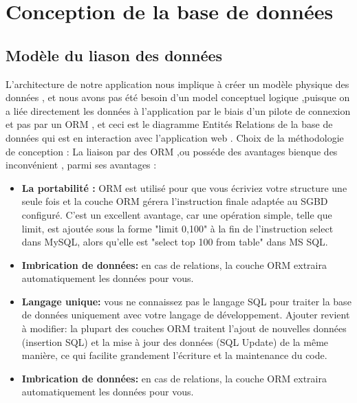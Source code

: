 \section{Conception de la base de donn\'{e}es}

\subsection{Mod\`{e}le du liason des donn\'{e}es }
L'architecture de notre application nous implique \`{a} cr\'{e}er un mod\`{e}le physique
des donn\'{e}es , et nous avons pas \'{e}t\'{e} besoin d'un model conceptuel logique
,puisque on a li\'{e}e directement les donn\'{e}es \`{a} l'application par le biais d'un
pilote de connexion et pas par un ORM , et ceci est le diagramme
Entit\'{e}s \textendash{}Relations de la base de donn\'{e}es qui est en interaction avec
l'application web .
Choix de la m\'{e}thodologie de conception :
La liaison par des ORM ,ou poss\'{e}de des avantages bienque des inconv\'{e}nient ,
parmi ses avantages :

\bigskip
\begin{itemize}
\item{\textbf{La portabilit\'{e} :}  ORM est utilis\'{e} pour que vous \'{e}criviez votre structure une
seule fois et la couche ORM g\'{e}rera l'instruction finale adapt\'{e}e au SGBD
configur\'{e}. C'est un excellent avantage, car une op\'{e}ration simple, telle que
limit, est ajout\'{e}e sous la forme "limit 0,100" \`{a} la fin de l'instruction select
dans MySQL, alors qu'elle est "select top 100 from table" dans MS SQL.}

\bigskip
\item{\textbf{Imbrication de donn\'{e}es:} en cas de relations, la couche ORM extraira
automatiquement les donn\'{e}es pour vous.}

\bigskip
\item{\textbf{Langage unique:} vous ne connaissez pas le langage SQL pour traiter la base
de donn\'{e}es uniquement avec votre langage de d\'{e}veloppement.
Ajouter revient \`{a} modifier: la plupart des couches ORM traitent l'ajout de
nouvelles donn\'{e}es (insertion SQL) et la mise \`{a} jour des donn\'{e}es (SQL
Update) de la m\^{e}me mani\`{e}re, ce qui facilite grandement l'\'{e}criture et la
maintenance du code.}

\item{\textbf{Imbrication de donn\'{e}es:} en cas de relations, la couche ORM extraira
automatiquement les donn\'{e}es pour vous.}

\end{itemize}

